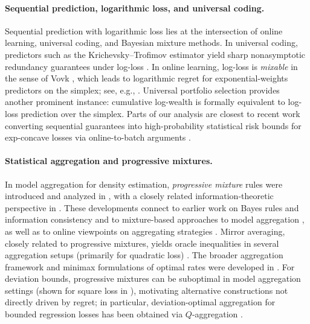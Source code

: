 \documentclass[11pt]{article}
\theoremstyle{definition}
\theoremstyle{remark}
\begin{document}
\paragraph{Sequential prediction, logarithmic loss, and universal coding.}
Sequential prediction with logarithmic loss lies at the intersection of online learning, universal coding, and Bayesian mixture methods.
In universal coding, predictors such as the Krichevsky--Trofimov estimator yield sharp nonasymptotic redundancy guarantees under log-loss \cite{krichevsky1981performance}.
In online learning, log-loss is \emph{mixable} in the sense of Vovk \cite{vovk1990aggregating}, which leads to logarithmic regret for exponential-weights predictors on the simplex; see, e.g., \cite{vovk1990aggregating,vovk1998mixability,cesabianchi2006plg,hazan2007logarithmic}.
Universal portfolio selection \cite{cover1991universal} provides another prominent instance: cumulative log-wealth is formally equivalent to log-loss prediction over the simplex.
Parts of our analysis are closest to recent work converting sequential guarantees into high-probability statistical risk bounds for exp-concave losses via online-to-batch arguments \cite{vanderhoeven2023high}.

\paragraph{Statistical aggregation and progressive mixtures.}
In model aggregation for density estimation, \emph{progressive mixture} rules were introduced and analyzed in \cite{yang2000mixing}, with a closely related information-theoretic perspective in \cite{yang1999information}.
These developments connect to earlier work on Bayes rules and information consistency \cite{barron1987bayes} and to mixture-based approaches to model aggregation \cite{catoni1997mixture}, as well as to online viewpoints on aggregating strategies \cite{desantis1988learning,vovk1990aggregating}.
Mirror averaging, closely related to progressive mixtures, yields oracle inequalities in several aggregation setups (primarily for quadratic loss) \cite{juditsky2008learning}.
The broader aggregation framework and minimax formulations of optimal rates were developed in \cite{nemirovski2000topics,tsybakov2003optimal}.
For deviation bounds, progressive mixtures can be suboptimal in model aggregation settings (shown for square loss in \cite{audibert2007progressive}), motivating alternative constructions not directly driven by regret; in particular, deviation-optimal aggregation for bounded regression losses has been obtained via $Q$-aggregation \cite{dai2012q-aggregation,lecue2014q-aggregation,bellec2017optimal,mourtada2023local}.
\end{document}
